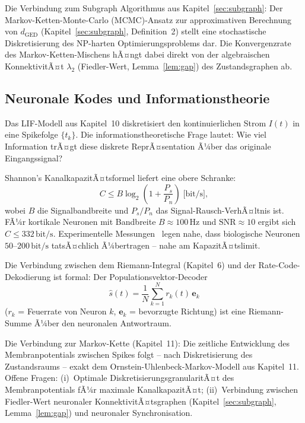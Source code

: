 ﻿\documentclass[a4paper,12pt]{article}
\theoremstyle{definition}
\begin{document}
Die Verbindung zum Subgraph Algorithmus aus Kapitel~\ref{sec:subgraph}: Der
Markov-Ketten-Monte-Carlo (MCMC)-Ansatz zur approximativen Berechnung von
$d_{\mathrm{GED}}$ (Kapitel~\ref{sec:subgraph}, Definition~2) stellt eine stochastische
Diskretisierung des NP-harten Optimierungsproblems dar. Die Konvergenzrate des
Markov-Ketten-Mischens hÃ¤ngt dabei direkt von der algebraischen KonnektivitÃ¤t
$\lambda_2$ (Fiedler-Wert, Lemma~\ref{lem:gap}) des Zustandsgraphen ab.

\subsection{Neuronale Kodes und Informationstheorie}

Das LIF-Modell aus Kapitel~10 diskretisiert den kontinuierlichen Strom $I(t)$ in eine
Spikefolge $\{t_k\}$. Die informationstheoretische Frage lautet: Wie viel Information
trÃ¤gt diese diskrete ReprÃ¤sentation Ã¼ber das originale Eingangssignal?

Shannon's KanalkapazitÃ¤tsformel liefert eine obere Schranke:
\[
C \leq B \log_2\!\left(1 + \frac{P_s}{P_n}\right) \;\text{[bit/s]},
\]
wobei $B$ die Signalbandbreite und $P_s/P_n$ das Signal-Rausch-VerhÃ¤ltnis ist.
FÃ¼r kortikale Neuronen mit Bandbreite $B \approx 100\,\text{Hz}$ und
$\mathrm{SNR} \approx 10$ ergibt sich $C \leq 332\,\text{bit/s}$.
Experimentelle Messungen~\cite{mainen1995} legen nahe, dass biologische Neuronen
$50$--$200\,\text{bit/s}$ tatsÃ¤chlich Ã¼bertragen -- nahe am KapazitÃ¤tslimit.

Die Verbindung zwischen dem Riemann-Integral (Kapitel~6) und der Rate-Code-Dekodierung
ist formal: Der Populationsvektor-Decoder
\[
\hat{s}(t) = \frac{1}{N}\sum_{k=1}^N r_k(t)\,\mathbf{e}_k
\]
($r_k$ = Feuerrate von Neuron $k$, $\mathbf{e}_k$ = bevorzugte Richtung)
ist eine Riemann-Summe Ã¼ber den neuronalen Antwortraum.

Die Verbindung zur Markov-Kette (Kapitel~11): Die zeitliche Entwicklung des Membranpotentials
zwischen Spikes folgt -- nach Diskretisierung des Zustandsraums -- exakt dem
Ornstein-Uhlenbeck-Markov-Modell aus Kapitel~11.
Offene Fragen: (i)~Optimale DiskretisierungsgranularitÃ¤t des Membranpotentials fÃ¼r
maximale KanalkapazitÃ¤t; (ii)~Verbindung zwischen Fiedler-Wert neuronaler
KonnektivitÃ¤tsgraphen (Kapitel~\ref{sec:subgraph}, Lemma~\ref{lem:gap}) und neuronaler
Synchronisation.
\end{document}
